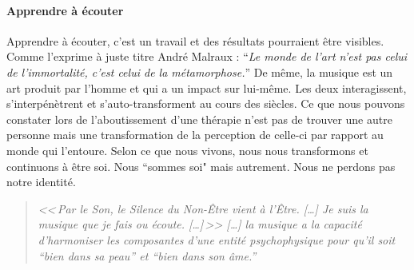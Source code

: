 
% 

\paragraph{Apprendre à écouter}

Apprendre à écouter,
c'est un travail et des résultats pourraient être visibles.
Comme l'exprime à juste titre André Malraux : \enquote{\emph{Le monde de
	l'art n'est pas celui de l'immortalité, c'est celui de la métamorphose.}}
De même, la musique est un art produit par l'homme et qui a un impact
sur lui-même. Les deux interagissent, s'interpénètrent et s'auto-transforment
au cours des siècles.
 Ce que nous pouvons constater lors de l'aboutissement
d'une thérapie n'est pas de trouver une autre personne mais une transformation
de la perception de celle-ci par rapport au monde qui l'entoure. 
Selon
ce que nous vivons, nous nous transformons et continuons à être
soi. Nous ``sommes soi" mais autrement. Nous ne perdons
pas notre identité.


\label{jeSuisLaMusique:viret}
\begin{quotation}
\emph{<<\,\emph{Par le Son, le Silence du Non-Être vient à l'Être}. [\dots] 
\textsl{Je suis}
	\emph{la musique que je fais ou écoute}. [\dots]\,>>
[\ldots] \emph{la musique a la capacité d'harmoniser
les composantes d'une entité psychophysique pour qu'il soit ``bien
dans sa peau'' et ``bien dans son âme.}''}\, \autocite[ch. 1,  p. 8]{viret:b}
\end{quotation}




